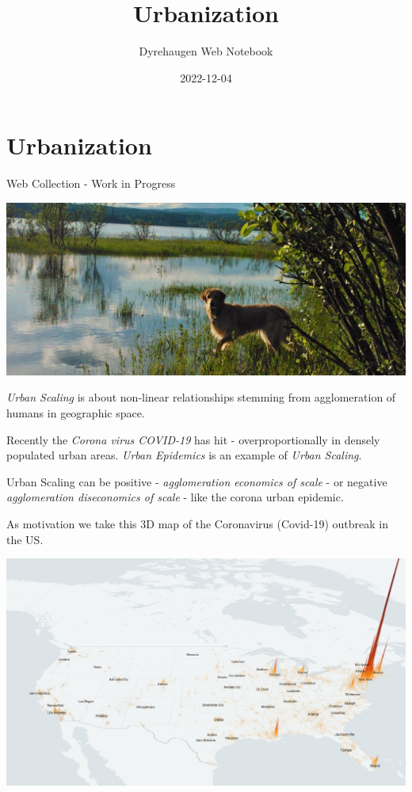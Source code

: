 \documentclass[
]{book}
\title{Urbanization}
\author{Dyrehaugen Web Notebook}
\date{2022-12-04}
\begin{document}
\maketitle

{
\setcounter{tocdepth}{1}
\tableofcontents
}
\hypertarget{urbanization}{%
\chapter{Urbanization}\label{urbanization}}

Web Collection - Work in Progress

\includegraphics{fig/zelda.jpg}

\emph{Urban Scaling} is about non-linear relationships stemming from agglomeration of humans
in geographic space.

Recently the \emph{Corona virus COVID-19} has hit - overproportionally in densely populated urban areas.
\emph{Urban Epidemics} is an example of \emph{Urban Scaling}.

Urban Scaling can be positive - \emph{agglomeration economics of scale} - or negative
\emph{agglomeration diseconomics of scale} - like the corona urban epidemic.

As motivation we take this 3D map of the Coronavirus (Covid-19) outbreak in the US.

\includegraphics{fig/Corona_Cases_pc_US_3D.jpeg}
\end{document}
